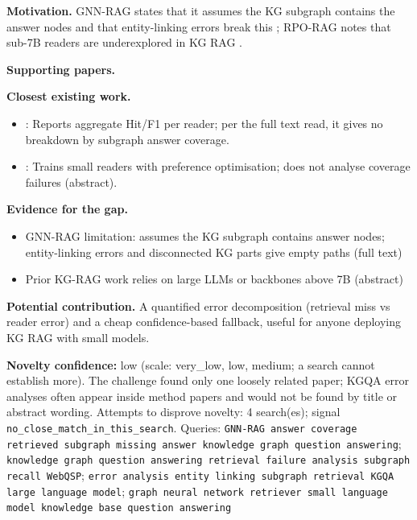 \documentclass[11pt,a4paper]{article}
\begin{document}
\textbf{Motivation.} GNN-RAG states that it assumes the KG subgraph contains the answer nodes and that entity-linking errors break this \cite{mavromatis2024gnnrag}; RPO-RAG notes that sub-7B readers are underexplored in KG RAG \cite{um2026rporag}.

\textbf{Supporting papers.} \cite{mavromatis2024gnnrag,um2026rporag}

\textbf{Closest existing work.}
\begin{itemize}
\item \cite{mavromatis2024gnnrag}: Reports aggregate Hit/F1 per reader; per the full text read, it gives no breakdown by subgraph answer coverage.
\item \cite{um2026rporag}: Trains small readers with preference optimisation; does not analyse coverage failures (abstract).
\end{itemize}

\textbf{Evidence for the gap.}
\begin{itemize}
\item [V] GNN-RAG limitation: assumes the KG subgraph contains answer nodes; entity-linking errors and disconnected KG parts give empty paths (full text) \cite{mavromatis2024gnnrag}
\item [V] Prior KG-RAG work relies on large LLMs or backbones above 7B (abstract) \cite{um2026rporag}
\end{itemize}

\textbf{Potential contribution.} A quantified error decomposition (retrieval miss vs reader error) and a cheap confidence-based fallback, useful for anyone deploying KG RAG with small models.

\textbf{Novelty confidence:} low (scale: very\_low, low, medium; a search cannot establish more). The challenge found only one loosely related paper; KGQA error analyses often appear inside method papers and would not be found by title or abstract wording.
Attempts to disprove novelty: 4 search(es); signal \texttt{no\_close\_match\_in\_this\_search}. Queries: \texttt{GNN-RAG answer coverage retrieved subgraph missing answer knowledge graph question answering}; \texttt{knowledge graph question answering retrieval failure analysis subgraph recall WebQSP}; \texttt{error analysis entity linking subgraph retrieval KGQA large language model}; \texttt{graph neural network retriever small language model knowledge base question answering}
\end{document}
